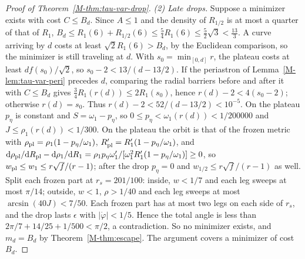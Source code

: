 \documentclass[aip,jmp,amsmath,amssymb,reprint]{revtex4-2}
\newcommand{\dd}{\mathrm{d}}
\theoremstyle{plain}
\theoremstyle{definition}
\begin{document}
\begin{proof}[Proof of Theorem~\ref{M-thm:tau-var-drop}]
\emph{(2) Late drops.} Suppose a minimizer exists with cost $C\le B_d$. Since $A\le1$ and the density of
$R_{1/2}$ is at most a quarter of that of $R_1$, $B_d\le R_1(6)+R_{1/2}(6)\le\frac54R_1(6)\le\frac52\sqrt3<\frac{13}3$.
A curve arriving by $d$ costs at least $\sqrt2R_1(6)>B_d$, by the Euclidean comparison, so the minimizer
is still traveling at $d$. With $s_0=\min_{[0,d]}r$, the plateau costs at least $df(s_0)/\sqrt2$, so
$s_0-2<13/(d-13/2)$. If the periastron of Lemma~\ref{M-lem:tau-var-peri} precedes $d$, comparing the radial
barriers before and after it with $C\le B_d$ gives $\frac34R_1(r(d))\le2R_1(s_0)$, hence
$r(d)-2<4(s_0-2)$; otherwise $r(d)=s_0$. Thus $r(d)-2<52/(d-13/2)<10^{-5}$. On the plateau $p_\eta$ is
constant and $S=\omega_1-p_\eta$, so $0\le p_\eta<\omega_1(r(d))<1/200000$ and $J\le\rho_1(r(d))<1/300$. On the plateau the
orbit is that of the frozen metric with $\rho_{\rm pl}=\rho_1(1-p_\eta/\omega_1)$, $R_{\rm pl}'=R_1'(1-p_\eta/\omega_1)$, and
$\dd\rho_{\rm pl}/\dd R_{\rm pl}-\dd\rho_1/\dd R_1=\rho_1p_\eta\omega_1'/[\omega_1^2R_1'(1-p_\eta/\omega_1)]\ge0$, so $w_{\rm pl}\le w_1\le r\sqrt f/(r-1)$;
after the drop $p_\eta=0$ and $w_{1/2}\le r\sqrt f/(r-1)$ as well. Split each frozen part at $r_s=201/100$:
inside, $w<1/7$ and each leg sweeps at most $\pi/14$; outside, $w<1$, $\rho>1/40$ and each leg sweeps at most
$\arcsin(40J)<7/50$. Each frozen part has at most two legs on each side of $r_s$, and the drop lasts
$\epsilon$ with $|\dot\varphi|<1/5$. Hence the total angle is less than $2\pi/7+14/25+1/500<\pi/2$, a contradiction.
So no minimizer exists, and $m_d=B_d$ by Theorem~\ref{M-thm:escape}. The argument covers a minimizer of
cost $B_d$.


\end{proof}
\end{document}
